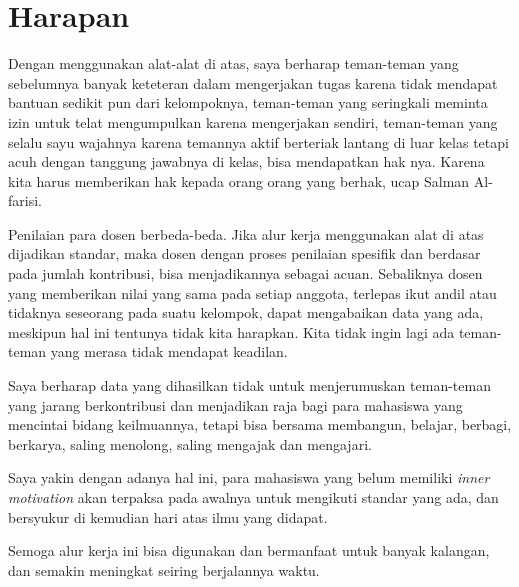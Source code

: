 \documentclass[a4paper,11pt]{article}
\begin{document}
\section{Harapan}
\label{sec:org51ee297}

Dengan menggunakan alat-alat di atas, saya berharap teman-teman yang
sebelumnya banyak keteteran dalam mengerjakan tugas karena tidak
mendapat bantuan sedikit pun dari kelompoknya, teman-teman yang
seringkali meminta izin untuk telat mengumpulkan karena mengerjakan
sendiri, teman-teman yang selalu sayu wajahnya karena temannya aktif
berteriak lantang di luar kelas tetapi acuh dengan tanggung jawabnya
di kelas, bisa mendapatkan hak nya. Karena kita harus memberikan hak
kepada orang orang yang berhak, ucap Salman Al-farisi\cite{wiki-salman}.

Penilaian para dosen berbeda-beda. Jika alur kerja menggunakan alat di
atas dijadikan standar, maka dosen dengan proses penilaian spesifik
dan berdasar pada jumlah kontribusi, bisa menjadikannya sebagai acuan.
Sebaliknya dosen yang memberikan nilai yang sama pada setiap anggota,
terlepas ikut andil atau tidaknya seseorang pada suatu kelompok, dapat
mengabaikan data yang ada, meskipun hal ini tentunya tidak kita
harapkan. Kita tidak ingin lagi ada teman-teman yang merasa tidak
mendapat keadilan.

Saya berharap data yang dihasilkan tidak untuk menjerumuskan
teman-teman yang jarang berkontribusi dan menjadikan raja bagi para
mahasiswa yang mencintai bidang keilmuannya, tetapi bisa bersama
membangun, belajar, berbagi, berkarya, saling menolong, saling
mengajak dan mengajari.

Saya yakin dengan adanya hal ini, para mahasiswa yang belum memiliki
\emph{inner motivation} akan terpaksa pada awalnya untuk mengikuti
standar yang ada, dan bersyukur di kemudian hari atas ilmu yang
didapat.

Semoga alur kerja ini bisa digunakan dan bermanfaat untuk banyak
kalangan, dan semakin meningkat seiring berjalannya waktu.
\end{document}
